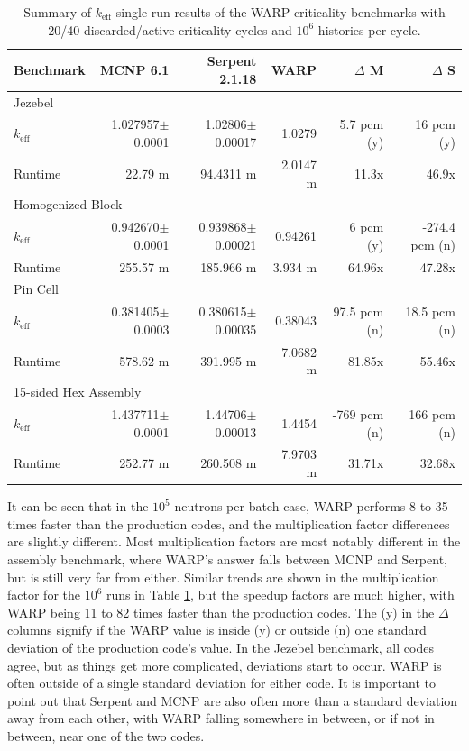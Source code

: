 \begin{table}[h]
\centering
\caption{Summary of $k_\mathrm{eff}$ single-run results of the WARP criticality benchmarks with 20/40 discarded/active criticality cycles and $10^6$ histories per cycle.}
\label{benchmark_summary_6}
\begin{tabular}{| l | r | r | r | r | r |}
 \hline
 Benchmark & MCNP 6.1 & Serpent 2.1.18 & WARP & $\Delta$ M & $\Delta$ S  \\
\hline
\hline
\multicolumn{6}{|l|}{Jezebel}  \\
\hline
 $k_\mathrm{eff}$ & 1.027957$\pm$0.0001 & 1.02806$\pm$0.00017 & 1.0279 & 5.7 pcm (y)& 16 pcm  (y) \\
 \hline
 Runtime               & 22.79 m & 94.4311 m &  2.0147 m & 11.3x  & 46.9x  \\
 \hline
 \hline
\multicolumn{6}{|l|}{Homogenized Block }\\
\hline
 $k_\mathrm{eff}$ & 0.942670$\pm$0.0001 & 0.939868$\pm$0.00021 & 0.94261 & 6 pcm (y) &  -274.4 pcm (n)  \\
 \hline
 Runtime               & 255.57 m & 185.966 m & 3.934 m & 64.96x & 47.28x  \\
 \hline
  \hline
\multicolumn{6}{|l|}{Pin Cell}\\
\hline
 $k_\mathrm{eff}$ & 0.381405$\pm$0.0003 & 0.380615$\pm$0.00035 & 0.38043 & 97.5 pcm (n) &  18.5 pcm (n)  \\
 \hline
 Runtime               & 578.62 m & 391.995 m & 7.0682 m & 81.85x & 55.46x \\
 \hline
  \hline
\multicolumn{6}{|l|}{15-sided Hex Assembly}\\
\hline
 $k_\mathrm{eff}$ & 1.437711$\pm$0.0001 & 1.44706$\pm$0.00013 & 1.4454 & -769 pcm (n) &  166 pcm (n) \\
 \hline
 Runtime               & 252.77 m & 260.508 m & 7.9703 m & 31.71x & 32.68x \\
 \hline
\end{tabular}
\end{table}

It can be seen that in the $10^5$ neutrons per batch case, WARP performs 8 to 35 times faster than the production codes, and the multiplication factor differences are slightly different.  Most multiplication factors are most notably different in the assembly benchmark, where WARP's answer falls between MCNP and Serpent, but is still very far from either.  Similar trends are shown in the multiplication factor for the $10^6$ runs in Table \ref{benchmark_summary_6}, but the speedup factors are much higher, with WARP being 11 to 82 times faster than the production codes.  The (y) in the $\Delta$ columns signify if the WARP value is inside (y) or outside (n) one standard deviation of the production code's value.  In the Jezebel benchmark, all codes agree, but as things get more complicated, deviations start to occur.  WARP is often outside of a single standard deviation for either code.  It is important to point out that Serpent and MCNP are also often more than a standard deviation away from each other, with WARP falling somewhere in between, or if not in between, near one of the two codes.

